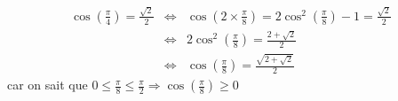 \begin{eqnarray*}
\cos\left(\frac{\pi}{4}\right) = \frac{\sqrt{2}}{2} & \Leftrightarrow & \cos\left(2\times \frac{\pi}{8}\right) = 2\cos^2\left(\frac{\pi}{8}\right) -1 = \frac{\sqrt{2}}{2} \\
 & \Leftrightarrow &  2\cos^2\left(\frac{\pi}{8}\right) = \frac{2+\sqrt{2}}{2} \\
  & \Leftrightarrow &  \cos\left(\frac{\pi}{8}\right) = \frac{\sqrt{2+\sqrt{2}}}{2} 
\end{eqnarray*}
car on sait que $0\leq \frac{\pi}{8} \leq \frac{\pi}{2} \Rightarrow \cos\left( \frac{\pi}{8}\right)\geq 0$
